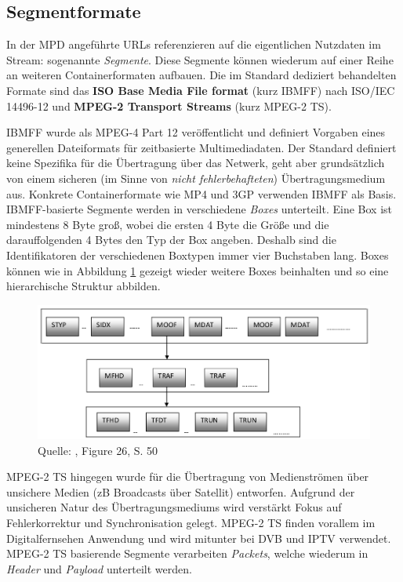 \documentclass[paper = a4, fontsize = 12pt, parskip = half]{scrartcl} %
\begin{document}
\subsection{Segmentformate}
\label{segment_formats}
In der MPD angeführte URLs referenzieren auf die eigentlichen Nutzdaten im Stream: sogenannte \textit{Segmente}. Diese Segmente können wiederum auf einer Reihe an weiteren Containerformaten aufbauen. Die im Standard dediziert behandelten Formate sind das \textbf{ISO Base Media File format} (kurz IBMFF) nach ISO/IEC 14496-12 und \textbf{MPEG-2 Transport Streams} (kurz MPEG-2 TS).

IBMFF wurde als MPEG-4 Part 12 veröffentlicht und definiert Vorgaben eines generellen Dateiformats für zeitbasierte Multimediadaten. Der Standard definiert keine Spezifika für die Übertragung über das Netwerk, geht aber grundsätzlich von einem sicheren (im Sinne von \textit{nicht fehlerbehafteten}) Übertragungsmedium aus. Konkrete Containerformate wie MP4 und 3GP verwenden IBMFF als Basis. IBMFF-basierte Segmente werden in verschiedene \textit{Boxes} unterteilt. Eine Box ist mindestens 8 Byte groß, wobei die ersten 4 Byte die Größe und die darauffolgenden 4 Bytes den Typ der Box angeben. Deshalb sind die Identifikatoren der verschiedenen Boxtypen immer vier Buchstaben lang. Boxes können wie in Abbildung \ref{ibmff_boxes} gezeigt wieder weitere Boxes beinhalten und so eine hierarchische Struktur abbilden.

\begin{figure}[ht]
	\centering
	\includegraphics[width=12cm]{images/isobmff_boxes.png}
	\caption{Quelle: \cite{mazhar_compliance_2011}, Figure 26, S. 50}
	\label{ibmff_boxes}
\end{figure}

MPEG-2 TS hingegen wurde für die Übertragung von Medienströmen über unsichere Medien (zB Broadcasts über Satellit) entworfen. Aufgrund der unsicheren Natur des Übertragungsmediums wird verstärkt Fokus auf Fehlerkorrektur und Synchronisation gelegt. MPEG-2 TS finden vorallem im Digitalfernsehen Anwendung und wird mitunter bei DVB und IPTV verwendet. MPEG-2 TS basierende Segmente verarbeiten \textit{Packets}, welche wiederum in \textit{Header} und \textit{Payload} unterteilt werden.
\end{document}

